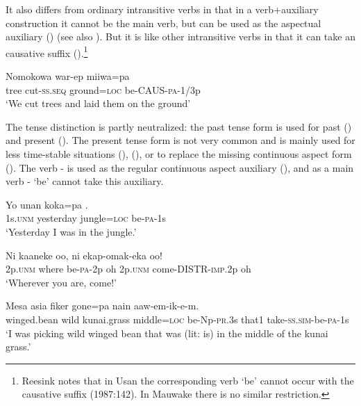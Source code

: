It also differs from ordinary intransitive verbs in that in a verb+auxiliary construction it cannot be the main verb, but can be used as the aspectual auxiliary () (see also ). But it is like other intransitive verbs in that it can take an causative suffix ().\footnote{Reesink notes that in Usan the corresponding verb  `be' cannot occur with the causative suffix (1987:142). In Mauwake there is no similar restriction.} 

\ea%
\label{ex:x261}
\gll Nomokowa war-ep miiwa=pa  \\
tree cut-\textsc{ss}.\textsc{seq} ground=\textsc{loc} be-CAUS-\textsc{pa}-1/3p\\
\glt`We cut trees and laid them on the ground' 
\z

The tense distinction is partly neutralized: the past tense form is used for past () and present (). The present tense form is not very common and is mainly used for less time-stable situations (), (), or to replace the missing continuous aspect form (). The verb - is used as the regular continuous aspect auxiliary (), and as a main verb - `be' cannot take this auxiliary. 

\ea%
\label{ex:x263}
\gll Yo unan koka=pa . \\
1s.\textsc{unm} yesterday jungle=\textsc{loc} be-\textsc{pa}-1s \\
\glt`Yesterday I was in the jungle.' 
\z

\ea%
\label{ex:x264}
\gll Ni kaaneke  oo, ni ekap-omak-eka oo! \\
2p.\textsc{unm} where be-\textsc{pa}-2p oh 2p.\textsc{unm} come-DISTR-\textsc{imp}.2p oh \\
\glt`Wherever you are, come!'
\z

\ea%
\label{ex:x1028}
\gll Mesa asia fiker gone=pa  nain aaw-em-ik-e-m.\\
winged.bean wild kunai.grass middle=\textsc{loc} be-Np-\textsc{pr}.3s that1 take-\textsc{ss}.\textsc{sim}-be-\textsc{pa}-1s\\
\glt`I was picking wild winged bean that was (lit: is) in the middle of the kunai grass.'
\z

